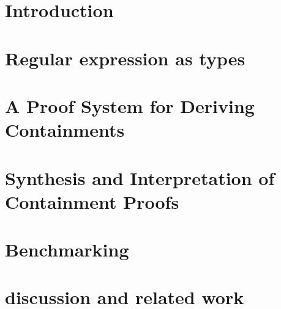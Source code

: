 \documentclass[runningheads]{llncs}
\begin{document}
 \section{Introduction}\label{sec:introduction}
  

\section{Regular expression as types}\label{sec:background}


\section{A Proof System for Deriving Containments}\label{sec:axiomatization}


% 

\section{Synthesis and Interpretation of Containment
Proofs} \label{sec:soundness}








\section{Benchmarking}


\section{discussion and related work}\label{sec:discussion}



   
\end{document}
